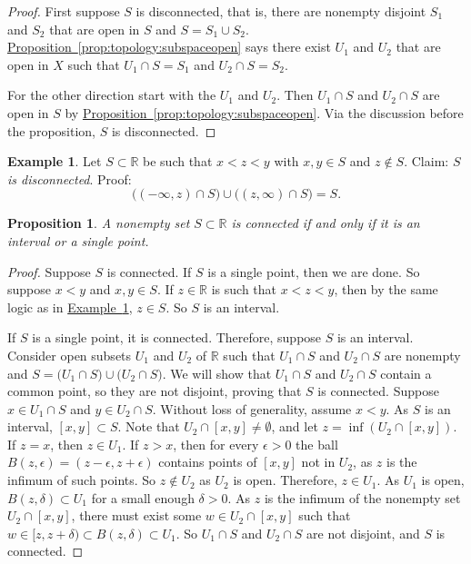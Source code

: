 \documentclass[12pt,openany]{book}
\newcommand{\R}{{\mathbb{R}}}
\theoremstyle{plain}
\newtheorem{prop}[thm]{Proposition}
\theoremstyle{remark}
\theoremstyle{definition}
\theoremstyle{exercise}
\theoremstyle{example}
\newtheorem{example}[thm]{Example}
\newcommand{\exampleref}[1]{\hyperref[#1]{Example~\ref*{#1}}}
\newcommand{\propref}[1]{\hyperref[#1]{Proposition~\ref*{#1}}}
\begin{document}
\begin{proof}
First suppose $S$ is disconnected, that is, there are
nonempty disjoint $S_1$ and $S_2$ that are
open in $S$ and $S = S_1 \cup S_2$.
\propref{prop:topology:subspaceopen} says there exist $U_1$ and $U_2$
that are open in $X$ such that $U_1 \cap S = S_1$ and
$U_2 \cap S = S_2$.

For the other direction start with the $U_1$ and $U_2$.
Then $U_1 \cap S$ and $U_2 \cap S$ are open in $S$ by
\propref{prop:topology:subspaceopen}.
Via the discussion before the proposition, $S$ is disconnected.
\end{proof}

\begin{example}\label{example:disconnectedsetinR}
Let $S \subset \R$ be such that $x < z < y$ with $x,y \in S$
and $z \notin S$.  Claim: \emph{$S$ is disconnected}.  Proof:
\begin{equation*}
\bigl( (-\infty,z) \cap S \bigr)
\cup
\bigl( (z,\infty) \cap S \bigr)
= S .
\end{equation*}
\end{example}

\begin{prop}
A nonempty set $S \subset \R$ is connected if and only if it is
an interval or a single point.
\end{prop}

\begin{proof}
Suppose $S$ is connected.  If $S$ is a single point,
then we are done.  So suppose $x < y$ and $x,y \in S$.  If $z \in \R$ is such
that $x < z < y$, then by the same logic as in
\exampleref{example:disconnectedsetinR}, $z \in S$.
So $S$ is an interval.

If $S$ is a single point, it is connected.
Therefore, suppose $S$ is an interval.
Consider open subsets $U_1$ and $U_2$ of $\R$ such that
$U_1 \cap S$ and $U_2 \cap S$ are nonempty and
$S = 
\bigl( U_1 \cap S \bigr)
\cup
\bigl( U_2 \cap S \bigr)$.  We will show that $U_1 \cap S$
and $U_2 \cap S$ contain a common point, so they are not disjoint,
proving that $S$ is connected.
Suppose $x \in U_1 \cap S$
and $y \in U_2 \cap S$.  Without loss of generality, assume $x < y$.
As $S$ is an interval, $[x,y] \subset S$.
Note that $U_2 \cap [x,y] \neq \emptyset$, and
let $z = \inf (U_2 \cap [x,y])$.
If $z = x$, then $z \in U_1$.
If $z > x$,
then for every $\epsilon > 0$ the ball $B(z,\epsilon) =
(z-\epsilon,z+\epsilon)$ contains points of $[x,y]$ not in $U_2$,
as $z$ is the infimum of such points.
So $z \notin U_2$ as $U_2$ is open.
Therefore, $z \in U_1$. %
As $U_1$ is open,
$B(z,\delta) \subset U_1$ for a small enough $\delta > 0$.
As $z$ is the infimum of the nonempty set $U_2 \cap [x,y]$, 
there must exist some $w \in U_2 \cap [x,y]$
such that $w \in [z,z+\delta) \subset B(z,\delta) \subset U_1$.
So $U_1 \cap S$ and $U_2 \cap S$ are not disjoint, and
$S$ is connected.
\end{proof}
\end{document}
